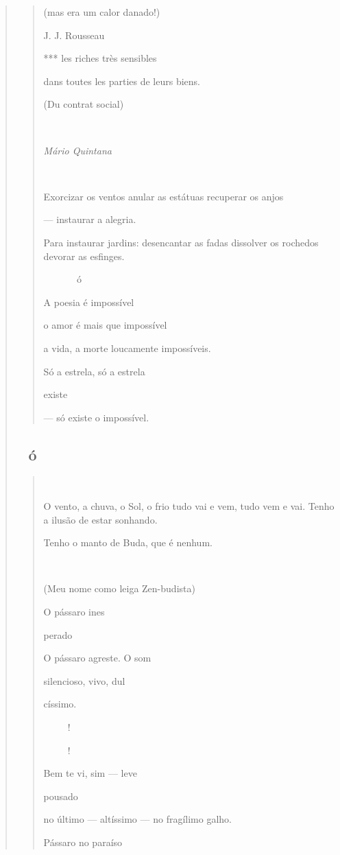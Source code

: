 \begin{verse}
\begin{quote}
(mas era um calor danado!)

J. J. Rousseau

*** les riches très sensibles

dans toutes les parties de leurs biens.

(Du contrat social)

 

\emph{Mário Quintana}



Exorcizar os ventos anular as estátuas recuperar os anjos

--- instaurar a alegria.

Para instaurar jardins: desencantar as fadas dissolver os rochedos
devorar as esfinges.

  ó

A poesia é impossível

o amor é mais que impossível

a vida, a morte loucamente impossíveis.

Só a estrela, só a estrela

existe

--- só existe o impossível.
\end{quote}

\subsection{ó}\label{section-6}

\begin{quote}


O vento, a chuva, o Sol, o frio tudo vai e vem, tudo vem e vai. Tenho a
ilusão de estar sonhando.

Tenho o manto de Buda, que é nenhum.

 

(Meu nome como leiga Zen-budista)

O pássaro ines

perado

O pássaro agreste. O som

silencioso, vivo, dul

císsimo.

!

!

Bem te vi, sim --- leve

pousado

no último --- altíssimo --- no fragílimo galho.

Pássaro no paraíso


\end{quote}
\end{verse}
